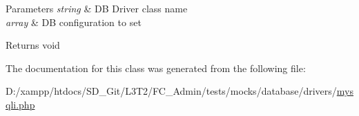 \begin{DoxyParams}{Parameters}
{\em string} & D\+B Driver class name \\
\hline
{\em array} & D\+B configuration to set \\
\hline
\end{DoxyParams}
\begin{DoxyReturn}{Returns}
void 
\end{DoxyReturn}


The documentation for this class was generated from the following file\+:\begin{DoxyCompactItemize}
\item 
D\+:/xampp/htdocs/\+S\+D\+\_\+\+Git/\+L3\+T2/\+F\+C\+\_\+\+Admin/tests/mocks/database/drivers/\hyperlink{drivers_2mysqli_8php}{mysqli.\+php}\end{DoxyCompactItemize}
